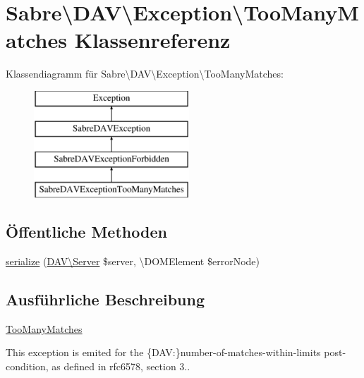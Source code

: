 \hypertarget{class_sabre_1_1_d_a_v_1_1_exception_1_1_too_many_matches}{}\section{Sabre\textbackslash{}D\+AV\textbackslash{}Exception\textbackslash{}Too\+Many\+Matches Klassenreferenz}
\label{class_sabre_1_1_d_a_v_1_1_exception_1_1_too_many_matches}
Klassendiagramm für Sabre\textbackslash{}D\+AV\textbackslash{}Exception\textbackslash{}Too\+Many\+Matches\+:\begin{figure}[H]
\begin{center}
\leavevmode
\includegraphics[height=4.000000cm]{class_sabre_1_1_d_a_v_1_1_exception_1_1_too_many_matches}
\end{center}
\end{figure}
\subsection*{Öffentliche Methoden}
\begin{DoxyCompactItemize}
\item 
\mbox{\hyperlink{class_sabre_1_1_d_a_v_1_1_exception_1_1_too_many_matches_af2c523f6962e53f6b39721eb2ac2c1a4}{serialize}} (\mbox{\hyperlink{class_sabre_1_1_d_a_v_1_1_server}{D\+A\+V\textbackslash{}\+Server}} \$server, \textbackslash{}D\+O\+M\+Element \$error\+Node)
\end{DoxyCompactItemize}


\subsection{Ausführliche Beschreibung}
\mbox{\hyperlink{class_sabre_1_1_d_a_v_1_1_exception_1_1_too_many_matches}{Too\+Many\+Matches}}

This exception is emited for the \{D\+AV\+:\}number-\/of-\/matches-\/within-\/limits post-\/condition, as defined in rfc6578, section 3..

